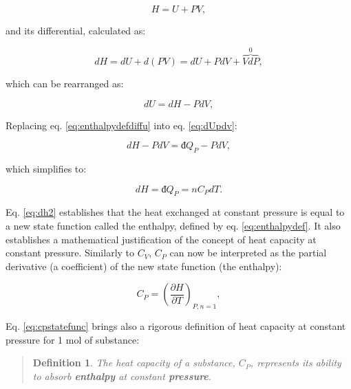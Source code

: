 \documentclass[
  9pt,
]{extbook}
\theoremstyle{definition}
\newtheorem{definition}{Definition}[chapter]
\theoremstyle{definition}
\theoremstyle{definition}
\theoremstyle{remark}
\begin{document}
\begin{equation}
  H = U + PV,
  \label{eq:enthalpydef}
\end{equation}

and its differential, calculated as:

\begin{equation}
  dH = dU + d(PV) = dU + PdV + \overbrace{VdP}^{0},
  \label{eq:enthalpydefdiff}
\end{equation}

which can be rearranged as:

\begin{equation}
  dU = dH -PdV,
  \label{eq:enthalpydefdiffu}
\end{equation}

Replacing eq. \eqref{eq:enthalpydefdiffu} into eq. \eqref{eq:dUpdv}:

\begin{equation}
  dH -PdV = đ Q_P - PdV,
  \label{eq:dh1}
\end{equation}

which simplifies to:

\begin{equation}
  dH = đ Q_P = n C_P dT.
  \label{eq:dh2}
\end{equation}

Eq. \eqref{eq:dh2} establishes that the heat exchanged at constant pressure is equal to a new state function called the enthalpy, defined by eq. \eqref{eq:enthalpydef}. It also establishes a mathematical justification of the concept of heat capacity at constant pressure. Similarly to \(C_V\), \(C_P\) can now be interpreted as the partial derivative (a coefficient) of the new state function (the enthalpy):

\begin{equation}
  C_P = \left( \frac{\partial H} {\partial T} \right)_{P,n=1},
  \label{eq:cpstatefunc}
\end{equation}

Eq. \eqref{eq:cpstatefunc} brings also a rigorous definition of heat capacity at constant pressure for 1 mol of substance:

\begin{quote}
\begin{definition}
\protect\hypertarget{def:newdefcp}{}{\label{def:newdefcp} }\emph{The heat capacity of a substance, \(C_P\), represents its ability to absorb \textbf{enthalpy} at constant \textbf{pressure}.}
\end{definition}
\end{quote}
\end{document}
